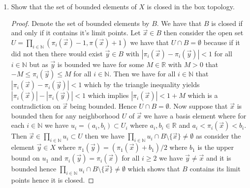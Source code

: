 \documentclass{amsart}
\theoremstyle{plain}
\theoremstyle{definition}
\theoremstyle{remark}
\begin{document}
\begin{enumerate}
\begin{proof}
    \end{proof}
    \item Show that the set of bounded elements of $X$ is closed in the box topology.
    \begin{proof}
    Denote the set of bounded elements by $B$. We have that $B$ is closed if and only if it contains it's limit points. Let $\vec{x} \in B$ then consider the open set $U=\prod_{i\in \mathbb{N}}(\pi_i(\vec{x})-1,\pi(\vec{x})+1)$ we have that $U\cap B=\emptyset$ because if it did not then there would exist $\vec{y}\in B$ with $|\pi_i(\vec{x})-\pi_i(\vec{y})|<1$ for all $i\in \mathbb{N}$ but as $\vec{y}$ is bounded we have for some $M\in \mathbb{R}$ with $M>0$ that $-M\leq \pi_i(\vec{y})\leq M$ for all $i\in \mathbb{N}$. Then we have for all $i\in \mathbb{N}$ that $|\pi_i(\vec{x})-\pi_i(\vec{y})|<1$ which by the triangle inequality yields $|\pi_i(\vec{x})|-|\pi_i(\vec{y})|<1$ which implies $|\pi_i(\vec{x})|<1+M$ which is a contradiction on $\vec{x}$ being bounded. Hence $U\cap B=\emptyset$. Now suppose that $\vec{x}$ is bounded then for any neighborhood $U$ of $\vec{x}$ we have a basis element where for each $i \in \mathbb{N}$ we have $u_i=(a_i,b_i)\subset U_i$ where $a_i,b_i\in \mathbb{R}$ and $a_i<\pi_i(\vec{x})<b_i$. Then $\vec{x}\in \prod_{i\in \mathbb{N}}u_i\subset U$ then we have $\prod_{i\in \mathbb{N}}u_i\cap B\setminus \{\vec{x}\}\not = \emptyset$ as consider the element $\vec{y}\in X$ where $\pi_1(\vec{y})=(\pi_1(\vec{x})+b_1)/2$ where $b_1$ is the upper bound on $u_1$ and $\pi_i(\vec{y})=\pi_i(\vec{x})$ for all $i\geq 2$ we have $\vec{y}\not = \vec{x}$ and it is bounded hence $\prod_{i\in \mathbb{N}}u_i\cap B\setminus \{\vec{x}\}\not = \emptyset$ which shows that $B$ contains its limit points hence it is closed.
    \end{proof}
        
    
\end{enumerate}
\end{document}
